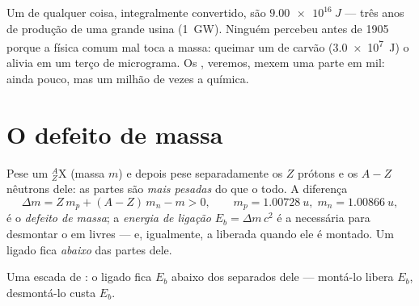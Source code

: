 \begin{example}\label{ex:g12:nuclear-energy:fortune}
Um  de qualquer coisa, integralmente convertido, são $\qty{9.00e16}{J}$ ---
três anos de produção de uma grande usina (\qty{1}{GW}). Ninguém percebeu antes de 1905
porque a física comum mal toca a massa: queimar um  de carvão
(\qty{3.0e7}{J}) o alivia em um terço de micrograma. Os , veremos, mexem uma parte
em mil: ainda pouco, mas um milhão de vezes a química.
\end{example}

\section{O defeito de massa}

\begin{definition}\label{def:g12:nuclear-energy:defect}
Pese um  ${}^{A}_{Z}\mathrm{X}$ (massa $m$) e depois pese separadamente os $Z$
prótons e os $A - Z$ nêutrons dele: as partes são \emph{mais pesadas} do que o todo. A
diferença
\[
\Delta m = Z\,m_p + (A - Z)\,m_n - m > 0,
\qquad m_p = \qty{1.00728}{u},\; m_n = \qty{1.00866}{u},
\]
é o \emph{defeito de massa}; a \emph{energia de
ligação} $E_b = \Delta m\,c^2$ é a  necessária para
desmontar o  em  livres --- e, igualmente, a  liberada quando ele é
montado. Um  ligado fica \emph{abaixo} das partes dele.
\end{definition}

\begin{omfigure}

{\small Uma escada de : o  ligado fica $E_b$ abaixo dos  separados
dele --- montá-lo libera $E_b$, desmontá-lo custa $E_b$.}
\end{omfigure}


